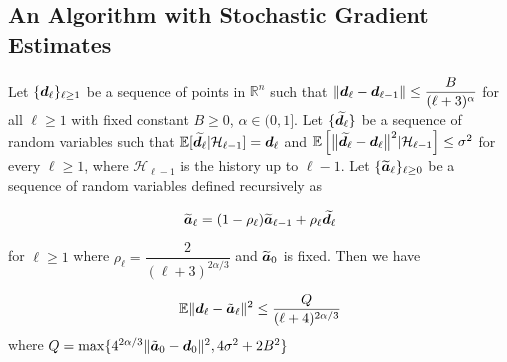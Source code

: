 

\subsection{An Algorithm with Stochastic Gradient Estimates}

\setcounter{lemma}{3}
\begin{lemma}
\label{lmm:red_var}
Let $\{\bm{d}_{\ell}\}_{\ell \geq 1}$ be a sequence of points in $\mathbb{R}^n$ such that $\|\bm{d}_{\ell} - \bm{d}_{\ell-1}\| \leq \dfrac{B}{(\ell +3)^{\alpha}}$ for all $\ell \geq 1$ with fixed constant $B \geq 0$, $\alpha \in (0,1]$. Let $\{ \widetilde{\bm{d}}_{\ell} \}$ be a sequence of random variables such that $\mathbb{E} [\widetilde{\bm{d}}_{\ell}|\mathcal{H}_{\ell-1}] = \bm{d}_{\ell}$ and $\mathbb{E} \left[ \bigl \| \widetilde{\bm{d}}_{\ell} - \bm{d}_{\ell} \bigr \|^2 | \mathcal{H}_{\ell-1} \right] \leq \sigma^2$ for every $\ell \geq 1$, where $\mathcal{H}_{\ell - 1}$ is the history up to $\ell-1$. Let $\{ \widetilde{\bm{a}}_{\ell}\}_{\ell \geq 0}$ be a sequence of random variables defined recursively as  
\begin{linenomath}
    \[ \widetilde{\bm{a}}_{\ell} = (1 - \rho_{\ell}) \widetilde{\bm{a}}_{\ell-1} + \rho_{\ell} \widetilde{\bm{d}}_{\ell} \] 
\end{linenomath}
%
for $\ell \geq 1$ where  $\rho_{\ell} = \dfrac{2}{(\ell+3)^{2\alpha/3}}$ and 
$\widetilde{\bm{a}}_{0}$ is fixed. Then we have 

\begin{equation*}
        \mathbb{E}{\|\bm{d}_{\ell} - \Tilde{\bm{a}}_{\ell} \|^2} \leq \frac{Q}{(\ell + 4)^{2\alpha/3}}
\end{equation*}
where $Q = \max\{4^{2\alpha/3}\|\Tilde{\bm{a}}_0 - \bm{d}_0\|^2, 4\sigma^2 + 2B^2\}$
\end{lemma}

